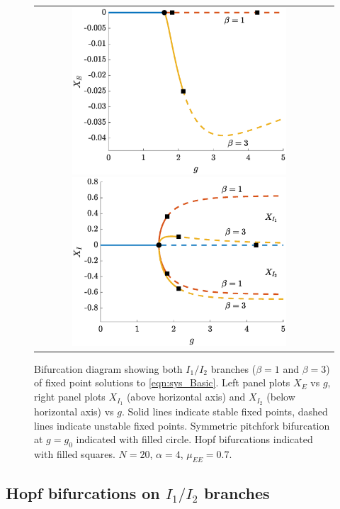\documentclass[11pt,reqno]{amsart}
\begin{document}
\begin{figure}
    \centering
    \begin{tabular}{cc}
    \includegraphics[width=8cm]{images/bdnoclusters20E.eps}
    \includegraphics[width=8cm]{images/bdnoclusters20I.eps}
    \end{tabular}
    \caption{Bifurcation diagram showing both $I_1/I_2$ branches ($\beta = 1$ and $\beta = 3$) of fixed point solutions to \cref{eqn:sys_Basic}. Left panel plots $X_E$ vs $g$, right panel plots $X_{I_1}$ (above horizontal axis) and $X_{I_2}$ (below horizontal axis) vs $g$. Solid lines indicate stable fixed points, dashed lines indicate unstable fixed points. Symmetric pitchfork bifurcation at $g = g_0$ indicated with filled circle. Hopf bifurcations indicated with filled squares. 
    $N = 20$,  $\alpha = 4$, $\mu_{EE} = 0.7$.}
    \label{fig:noclusterBD1}
\end{figure}

\subsection{Hopf bifurcations on $I_1/I_2$ branches}
\end{document}

